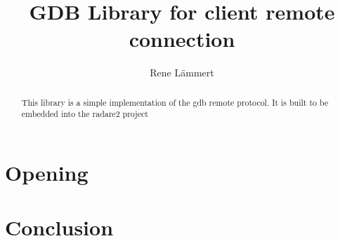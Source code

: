 \documentclass{article}
\begin{document}
\title{GDB Library for client remote connection}
\author{Rene L\"ammert}

\maketitle

\begin{abstract}
This library is a simple implementation of the gdb remote protocol.
It is built to be embedded into the radare2 project
\end{abstract}

\section{Opening}



\section{Conclusion}
\end{document}
